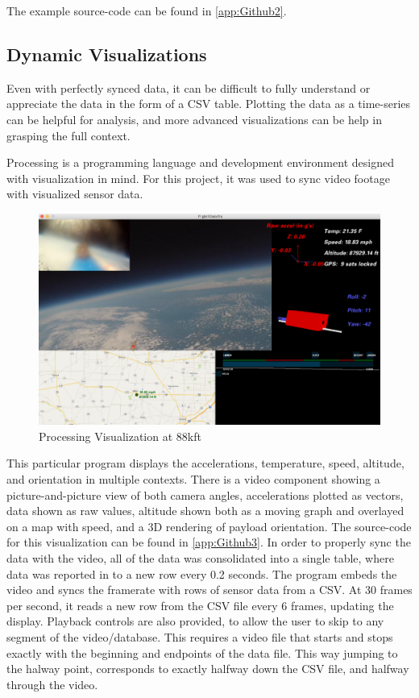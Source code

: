 \documentclass[heading.tex]{subfiles}
\begin{document}
The example source-code can be found in \cref{app:Github2}.

\subsection{Dynamic Visualizations}

Even with perfectly synced data, it can be difficult to fully understand or 
appreciate the data in the form of a CSV table. Plotting the data as a
time-series can be helpful for analysis, and more advanced visualizations can
be help in grasping the full context.

Processing is a programming language and development environment designed
with visualization in mind. For this project, it was used to sync video
footage with visualized sensor data. 

\begin{figure}[hbtp]
\centering
\includegraphics[width=1\textwidth]{images/space.png}
 \caption{Processing Visualization at 88kft}
\label{f:processing}
\end{figure}

This particular program displays the accelerations, temperature, speed,
altitude, and orientation in multiple contexts. There is a video component
showing a picture-and-picture view of both camera angles, accelerations plotted
as vectors, data shown as raw values, altitude shown both as a moving graph and
overlayed on a map with speed, and a 3D rendering of payload orientation.
The source-code for this visualization can be found in \cref{app:Github3}.
In order to properly sync the data with the video, all of the data was consolidated
into a single table, where data was reported in to a new row every 0.2 seconds.
The program embeds the video and syncs the framerate with rows of sensor data
from a CSV. At 30 frames per second, it reads a new row from the CSV file every
6 frames, updating the display. Playback controls are also provided, to allow
the user to skip to any segment of the video/database. This requires a video
file that starts and stops exactly with the beginning and endpoints of the data
file. This way jumping to the halway point, corresponds to exactly halfway down
the CSV file, and halfway through the video.
\end{document}
